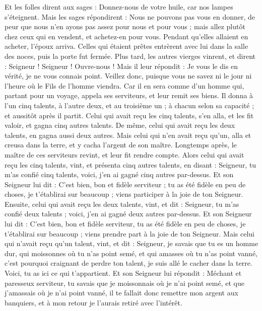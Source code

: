 \begin{multicols}{2}
Et les folles dirent aux sages : Donnez-nous de votre huile, car nos lampes s'éteignent.
Mais les sages répondirent : Nous ne pouvons pas vous en donner, de peur que nous n'en ayons pas assez pour nous et pour vous ; mais allez plutôt chez ceux qui en vendent, et achetez-en pour vous.
Pendant qu'elles allaient en acheter, l'époux arriva. Celles qui étaient prêtes entrèrent avec lui dans la salle des noces, puis la porte fut fermée.
Plus tard, les autres vierges vinrent, et dirent : Seigneur ! Seigneur ! Ouvre-nous !
Mais il leur répondit : Je vous le dis en vérité, je ne vous connais point.
Veillez donc, puisque vous ne savez ni le jour ni l'heure où le Fils de l'homme viendra.
Car il en sera comme d'un homme qui, partant pour un voyage, appela ses serviteurs, et leur remit ses biens.
Il donna à l'un cinq talents, à l'autre deux, et au troisième un ; à chacun selon sa capacité ; et aussitôt après il partit.
Celui qui avait reçu les cinq talents, s'en alla, et les fit valoir, et gagna cinq autres talents.
De même, celui qui avait reçu les deux talents, en gagna aussi deux autres.
Mais celui qui n'en avait reçu qu'un, alla et creusa dans la terre, et y cacha l'argent de son maître.
Longtemps après, le maître de ces serviteurs revint, et leur fit rendre compte.
Alors celui qui avait reçu les cinq talents, vint, et présenta cinq autres talents, en disant : Seigneur, tu m'as confié cinq talents, voici, j'en ai gagné cinq autres par-dessus.
Et son Seigneur lui dit : C’est bien, bon et fidèle serviteur ; tu as été fidèle en peu de choses, je t'établirai sur beaucoup ; viens participer à la joie de ton Seigneur.
Ensuite, celui qui avait reçu les deux talents, vint, et dit : Seigneur, tu m'as confié deux talents ; voici, j'en ai gagné deux autres par-dessus.
Et son Seigneur lui dit : C’est bien, bon et fidèle serviteur, tu as été fidèle en peu de choses, je t'établirai sur beaucoup ; viens prendre part à la joie de ton Seigneur.
Mais celui qui n'avait reçu qu'un talent, vint, et dit : Seigneur, je savais que tu es un homme dur, qui moissonnes où tu n'as point semé, et qui amasses où tu n'as point vanné,
c'est pourquoi craignant de perdre ton talent, je suis allé le cacher dans la terre. Voici, tu as ici ce qui t'appartient.
Et son Seigneur lui répondit : Méchant et paresseux serviteur, tu savais que je moissonnais où je n'ai point semé, et que j'amassais où je n'ai point vanné,
il te fallait donc remettre mon argent aux banquiers, et à mon retour je l'aurais retiré avec l'intérêt.

\end{multicols}
